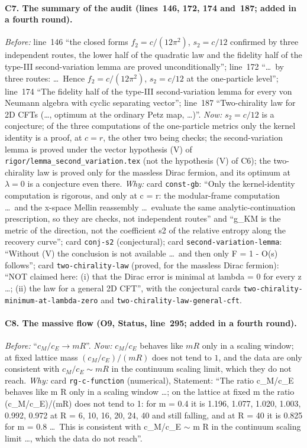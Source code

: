 \documentclass[11pt]{article}
\theoremstyle{accent}
\theoremstyle{definition}
\begin{document}
{\paragraph{C7. The summary of the audit (lines~146, 172, 174 and~187; added in a fourth round).}
\emph{Before:} line~146 ``the closed forms \(f_2=c/(12\pi^2)\), \(s_2=c/12\) confirmed by three independent routes,
the lower half of the quadratic law and the fidelity half of the type-III second-variation lemma are proved
unconditionally''; line~172 ``\dots\ by three routes: \dots\ Hence \(f_2=c/(12\pi^2)\), \(s_2=c/12\) at the one-particle level''; line~174 ``The fidelity half of the type-III second-variation lemma for every von Neumann algebra
with cyclic separating vector''; line~187 ``Two-chirality law for 2D CFTs (\dots, optimum at the ordinary Petz map,
\dots)''.
\emph{Now:} \(s_2=c/12\) is a conjecture; of the three computations of the one-particle metrics only the kernel
identity is a proof, at \(c=r\), the other two being checks; the second-variation lemma is proved under the vector
hypothesis (V) of \texttt{rigor/lemma\_second\_variation.tex} (not the hypothesis (V) of C6); the two-chirality law is proved only for the massless Dirac fermion, and its optimum at
\(\lambda=0\) is a conjecture even there.
\emph{Why:} card \texttt{const-gb}: ``Only the kernel-identity computation is rigorous, and only at c = r: the
modular-frame computation \dots\ and the x-space Mellin reassembly \dots\ evaluate the same analytic-continuation
prescription, so they are checks, not independent routes'' and ``g\_KM is the metric of the direction, not the coefficient s2 of the relative entropy along the recovery curve''; card \texttt{conj-s2} (conjectural); card
\texttt{second-variation-lemma}: ``Without (V) the conclusion is not available \dots\ and then only F = 1 - O(s)
follows''; card \texttt{two-chirality-law} (proved, for the massless Dirac fermion): ``NOT claimed here: (i) that the
Dirac error is minimal at lambda = 0 for every z \dots; (ii) the law for a general 2D CFT'', with the conjectural
cards \texttt{two-chirality-minimum-at-lambda-zero} and \texttt{two-chirality-law-general-cft}.
\paragraph{C8. The massive flow (O9, Status, line~295; added in a fourth round).}
\emph{Before:} ``\(c_M/c_E\to mR\)''.
\emph{Now:} \(c_M/c_E\) behaves like \(mR\) only in a scaling window; at fixed lattice mass \((c_M/c_E)/(mR)\) does not tend
to \(1\), and the data are only consistent with \(c_M/c_E\sim mR\) in the continuum scaling limit, which they do not reach.
\emph{Why:} card \texttt{rg-c-function} (numerical), Statement: ``The ratio c\_M/c\_E behaves like m R only in a scaling
window \dots; on the lattice at fixed m the ratio (c\_M/c\_E)/(mR) does not tend to 1: for m = 0.4 it is 1.196, 1.077,
1.020, 1.003, 0.992, 0.972 at R = 6, 10, 16, 20, 24, 40 and still falling, and at R = 40 it is 0.825 for m = 0.8 \dots\ This
is consistent with c\_M/c\_E \(\sim\) m R in the continuum scaling limit \dots, which the data do not reach''.
}
\end{document}
